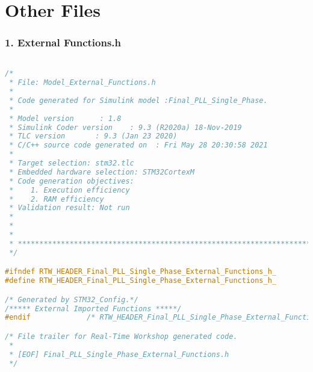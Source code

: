 \newpage

\section{Other Files}
\subsubsection{1. External Functions.h}
\begin{lstlisting}[language=C,caption=Model.c]

/*
 * File: Model_External_Functions.h
 *
 * Code generated for Simulink model :Final_PLL_Single_Phase.
 *
 * Model version      : 1.8
 * Simulink Coder version    : 9.3 (R2020a) 18-Nov-2019
 * TLC version       : 9.3 (Jan 23 2020)
 * C/C++ source code generated on  : Fri May 28 20:30:58 2021
 *
 * Target selection: stm32.tlc
 * Embedded hardware selection: STM32CortexM
 * Code generation objectives:
 *    1. Execution efficiency
 *    2. RAM efficiency
 * Validation result: Not run
 *
 *
 *
 * ******************************************************************************
 */

#ifndef RTW_HEADER_Final_PLL_Single_Phase_External_Functions_h_
#define RTW_HEADER_Final_PLL_Single_Phase_External_Functions_h_

/* Generated by STM32_Config.*/
/***** External Imported Functions *****/
#endif             /* RTW_HEADER_Final_PLL_Single_Phase_External_Functions_h_ */

/* File trailer for Real-Time Workshop generated code.
 *
 * [EOF] Final_PLL_Single_Phase_External_Functions.h
 */


\end{lstlisting}

